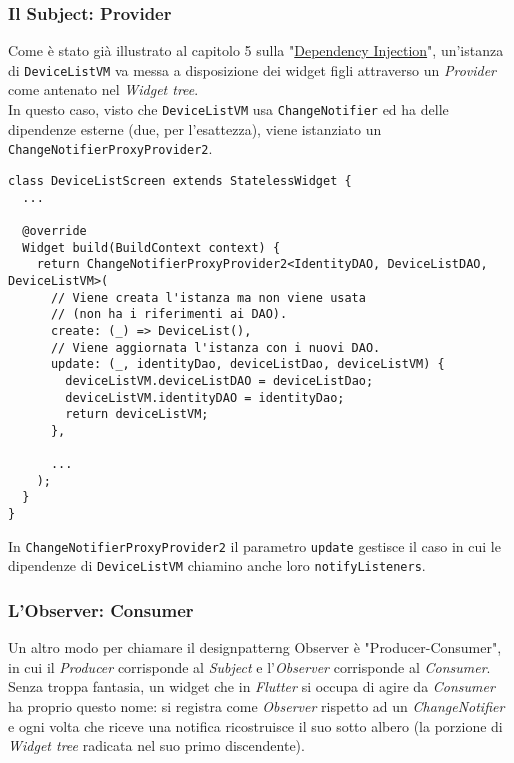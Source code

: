 \subsubsection{Il Subject: Provider}
\label{subsubsec:subject-provider}

Come è stato già illustrato al capitolo 5 sulla "\hyperref[cap:dependency-injection]{Dependency Injection}", un'istanza di \texttt{DeviceListVM} va messa a disposizione dei widget figli attraverso un \emph{Provider} come antenato nel \emph{Widget tree}.\\
In questo caso, visto che \texttt{DeviceListVM} usa \texttt{ChangeNotifier} ed ha delle dipendenze esterne (due, per l'esattezza), viene istanziato un \texttt{ChangeNotifierProxyProvider2}.
\begin{lstlisting}
class DeviceListScreen extends StatelessWidget {
  ...

  @override
  Widget build(BuildContext context) {
    return ChangeNotifierProxyProvider2<IdentityDAO, DeviceListDAO, DeviceListVM>(
      // Viene creata l'istanza ma non viene usata 
      // (non ha i riferimenti ai DAO).
      create: (_) => DeviceList(),
      // Viene aggiornata l'istanza con i nuovi DAO.
      update: (_, identityDao, deviceListDao, deviceListVM) {
        deviceListVM.deviceListDAO = deviceListDao;
        deviceListVM.identityDAO = identityDao;
        return deviceListVM;
      },

      ...
    );
  }
}
\end{lstlisting}
In \texttt{ChangeNotifierProxyProvider2} il parametro \texttt{update} gestisce il caso in cui le dipendenze di \texttt{DeviceListVM} chiamino anche loro \texttt{notifyListeners}.

\subsubsection{L'Observer: Consumer}
\label{subsubsec:observer-consumer}

Un altro modo per chiamare il \gls{designpatterng} Observer è "Producer-Consumer", in cui il \emph{Producer} corrisponde al \emph{Subject} e l'\emph{Observer} corrisponde al \emph{Consumer}.\\
Senza troppa fantasia, un widget che in \emph{Flutter} si occupa di agire da \emph{Consumer} ha proprio questo nome: si registra come \emph{Observer} rispetto ad un \emph{ChangeNotifier} e ogni volta che riceve una notifica ricostruisce il suo sotto albero (la porzione di \emph{Widget tree} radicata nel suo primo discendente).
\clearpage


